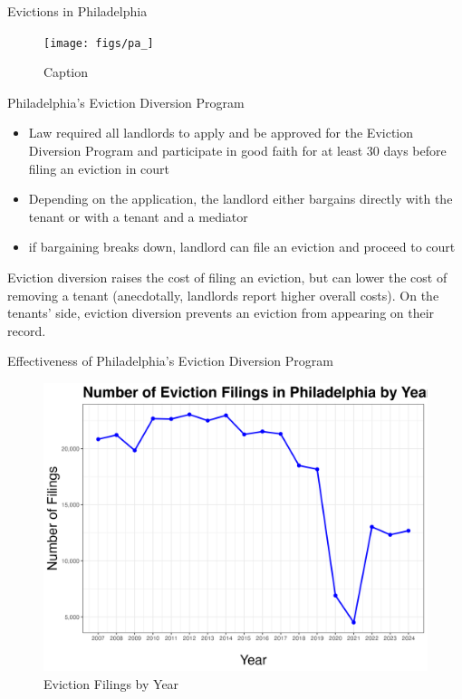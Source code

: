 \documentclass[10pt, xcolor=dvipsnames]{beamer}
\begin{document}
\begin{frame}{Evictions in Philadelphia}
    \begin{figure}
        \centering
        \texttt{[image: figs/pa\_]}
        \caption{Caption}
        \label{fig:placeholder}
    \end{figure}
\end{frame}


\begin{frame}{Philadelphia's Eviction Diversion Program}
    \begin{itemize}
        \item Law required all landlords to apply and be approved for the Eviction Diversion Program and participate in good faith for at least 30 days before filing an eviction in court
        \item Depending on the application, the landlord either bargains directly with the tenant or with a tenant and a mediator
        \item if bargaining breaks down, landlord can file an eviction and proceed to court
    \end{itemize}

    Eviction diversion raises the cost of filing an eviction, but can lower the cost of removing a tenant (anecdotally, landlords report higher overall costs). On the tenants' side, eviction diversion prevents an eviction from appearing on their record.
\end{frame}

\begin{frame}{Effectiveness of Philadelphia's Eviction Diversion Program}
    \begin{figure}
        \centering
        \includegraphics[width=0.75\linewidth]{figs/num_eviction_filings_by_year.png}
        \caption{Eviction Filings by Year}
        \label{fig:evict-year}
    \end{figure}
\end{frame}
\end{document}

